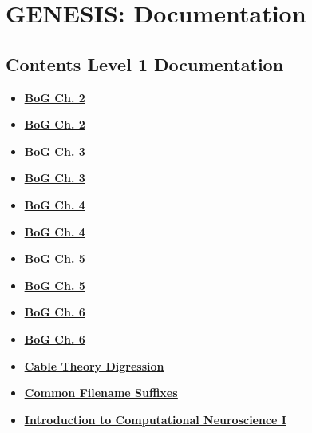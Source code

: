 \documentclass[12pt]{article}
\begin{document}
\section*{GENESIS: Documentation}

\subsection*{Contents Level 1 Documentation}

\begin{itemize}

\item \href{../bog-ch2/bog-ch2.pdf}{\bf \underline{BoG Ch. 2}}

\item \href{../bog-ch2/bog-ch2.pdf}{\bf \underline{BoG Ch. 2}}

\item \href{../bog-ch3/bog-ch3.pdf}{\bf \underline{BoG Ch. 3}}

\item \href{../bog-ch3/bog-ch3.pdf}{\bf \underline{BoG Ch. 3}}

\item \href{../bog-ch4/bog-ch4.pdf}{\bf \underline{BoG Ch. 4}}

\item \href{../bog-ch4/bog-ch4.pdf}{\bf \underline{BoG Ch. 4}}

\item \href{../bog-ch5/bog-ch5.pdf}{\bf \underline{BoG Ch. 5}}

\item \href{../bog-ch5/bog-ch5.pdf}{\bf \underline{BoG Ch. 5}}

\item \href{../bog-ch6/bog-ch6.pdf}{\bf \underline{BoG Ch. 6}}

\item \href{../bog-ch6/bog-ch6.pdf}{\bf \underline{BoG Ch. 6}}

\item \href{../cable-theory-digression/cable-theory-digression.pdf}{\bf \underline{Cable Theory Digression}}

\item \href{../common-suffixes/common-suffixes.pdf}{\bf \underline{Common Filename Suffixes}}

\item \href{../compneurosci-1/compneurosci-1.pdf}{\bf \underline{Introduction to Computational Neuroscience I}}


\end{itemize}
\end{document}
